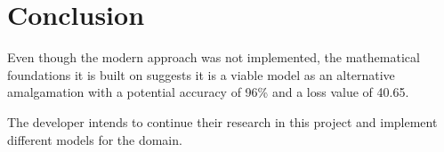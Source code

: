 \chapter{Conclusion}


Even though the modern approach was not implemented, the mathematical foundations it is built on suggests it is a viable model as an alternative amalgamation with a potential accuracy of 96\% and a loss value of 40.65.

The developer intends to continue their research in this project and implement different models for the domain.
